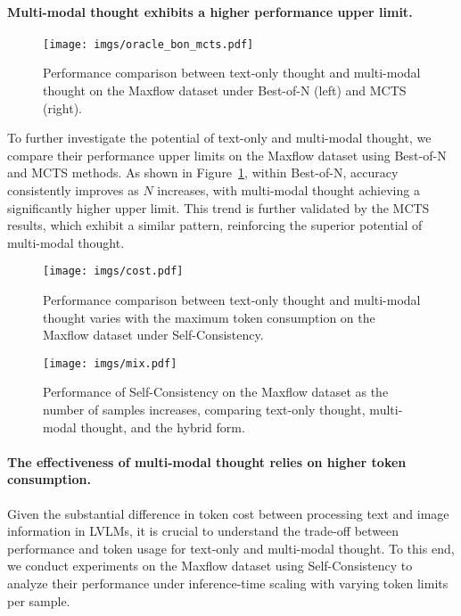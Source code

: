 \paragraph{Multi-modal thought exhibits a higher performance upper limit.}


\begin{figure}

    \centering
    \texttt{[image: imgs/oracle\_bon\_mcts.pdf]}
    \caption{Performance comparison between text-only thought and multi-modal thought on the Maxflow dataset under Best-of-N (left) and MCTS (right).}
    \label{fig:oracle}
\end{figure}


To further investigate the potential of text-only and multi-modal thought, we compare their performance upper limits on the Maxflow dataset using Best-of-N and MCTS methods. As shown in Figure~\ref{fig:oracle}, within Best-of-N, accuracy consistently improves as $N$ increases, with multi-modal thought achieving a significantly higher upper limit. This trend is further validated by the MCTS results, which exhibit a similar pattern, reinforcing the superior potential of multi-modal thought.

\begin{figure}[t]
  \texttt{[image: imgs/cost.pdf]}
  \caption{Performance comparison between text-only thought and multi-modal thought varies with the maximum token consumption on the Maxflow dataset under Self-Consistency.}
  \label{fig:cost}
\end{figure}



\begin{figure}[t]
\centering
  \texttt{[image: imgs/mix.pdf]}
  \caption{Performance of Self-Consistency on the Maxflow dataset as the number of samples increases, comparing text-only thought, multi-modal thought, and the hybrid form.}
  \label{fig:mix}
\end{figure}

\paragraph{The effectiveness of multi-modal thought relies on higher token consumption.} 
Given the substantial difference in token cost between processing text and image information in LVLMs, it is crucial to understand the trade-off between performance and token usage for text-only and multi-modal thought. To this end, we conduct experiments on the Maxflow dataset using Self-Consistency to analyze their performance under inference-time scaling with varying token limits per sample. 

